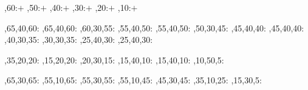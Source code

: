 \begin{chart}
	,60:{\Large$+$}
	,50:{\Large$+$}
	,40:{\Large$+$}
	,30:{\Large$+$}
	,20:{\Large$+$}
	,10:{\Large$+$}
	
	
	,65,40,60:
	,65,40,60:
	,60,30,55:
	,55,40,50:
	,55,40,50:
	,50,30,45:
	,45,40,40:
	,45,40,40:
	,40,30,35:
	,30,30,35:
	,25,40,30:
	,25,40,30:
	
	,35,20,20:
	,15,20,20:
	,20,30,15:
	,15,40,10:
	,15,40,10:
	,10,50,5:
	
	,65,30,65:
	,55,10,65:
	,55,30,55:
	,55,10,45:
	,45,30,45:
	,35,10,25:
	,15,30,5:
	
	
	
	\end{chart}
%
